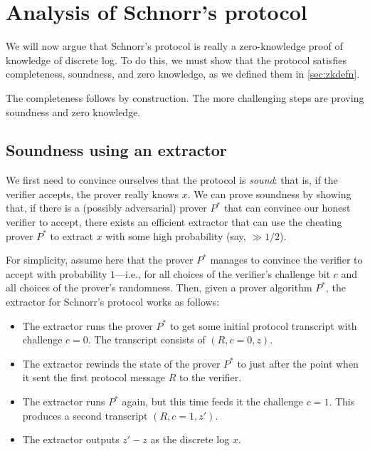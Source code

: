 \section{Analysis of Schnorr's protocol}

We will now argue that Schnorr's protocol is really
a zero-knowledge proof of knowledge of discrete log.
To do this, we must show that the protocol satisfies
completeness, soundness, and zero knowledge, as
we defined them in \cref{sec:zkdefn}.

The completeness follows by construction.
The more challenging steps are proving soundness and zero knowledge.

\subsection{Soundness using an extractor}

We first need to convince ourselves that the protocol is \emph{sound}: that is,
if the verifier accepts, the prover really knows $x$.  We can prove
soundness by showing that, if there is a (possibly adversarial) prover
$P^*$ that can convince our honest verifier to accept, there
exists an efficient extractor that can use the cheating prover $P^*$
to extract $x$ with some high probability (say, $\gg 1/2$).

For simplicity, assume here that the prover $P^*$ manages to convince
the verifier to accept with probability $1$---i.e., for all choices of
the verifier's challenge bit $c$ and all choices of the prover's randomness.
Then, given a prover algorithm $P^*$,
the extractor for Schnorr's protocol works as follows:

\begin{itemize}

\item The extractor runs the prover $P^*$ to get some initial protocol transcript with challenge $c=0$.
The transcript consists of $(R, c=0, z)$.

\item The extractor rewinds the state of the prover $P^*$ to just after the point when it
sent the first protocol message $R$ to the verifier.

\item The extractor runs $P^*$ again, but this time feeds it the challenge $c=1$.
This produces a second transcript $(R, c=1, z')$.

\item The extractor outputs $z'-z$ as the discrete log $x$.

\end{itemize}

